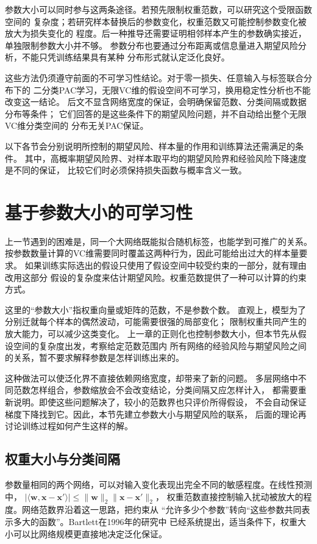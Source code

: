 参数大小可以同时参与这两条途径。若预先限制权重范数，可以研究这个受限函数空间的
复杂度；若研究样本替换后的参数变化，权重范数又可能控制参数变化被放大为损失变化的
程度。后一种推导还需要证明相邻样本产生的参数确实接近，单独限制参数大小并不够。
参数分布也要通过分布距离或信息量进入期望风险分析，不能只凭训练结果具有某种
分布形式就认定泛化良好。

这些方法仍须遵守前面的不可学习性结论。对于零一损失、任意输入与标签联合分布下的
二分类PAC学习，无限VC维的假设空间不可学习，换用稳定性分析也不能改变这一结论。
后文不显含网络宽度的保证，会明确保留范数、分类间隔或数据分布等条件；
它们回答的是这些条件下的期望风险问题，并不自动给出整个无限VC维分类空间的
分布无关PAC保证。

以下各节会分别说明所控制的期望风险、样本量的作用和训练算法还需满足的条件。
其中，高概率期望风险界、对样本取平均的期望风险界和经验风险下降速度是不同的保证，
比较它们时必须保持损失函数与概率含义一致。

\section{基于参数大小的可学习性}
\label{sec:network-norm-bounds}

上一节遇到的困难是，同一个大网络既能拟合随机标签，也能学到可推广的关系。
按参数数量计算的VC维需要同时覆盖这两种行为，因此可能给出过大的样本量要求。
如果训练实际选出的假设只使用了假设空间中较受约束的一部分，就有理由改用这部分
假设的复杂度来估计期望风险。权重范数提供了一种可以计算的约束方式。

这里的“参数大小”指权重向量或矩阵的范数，不是参数个数。
直观上，模型为了分别迁就每个样本的偶然波动，可能需要很强的局部变化；
限制权重共同产生的放大能力，可以减少这类变化。
上一章的正则化也控制参数大小，但本节先从假设空间的复杂度出发，考察给定范数范围内
所有网络的经验风险与期望风险之间的关系，暂不要求解释参数是怎样训练出来的。

这种做法可以使泛化界不直接依赖网络宽度，却带来了新的问题。
多层网络中不同范数怎样组合，参数缩放会不会改变结论，分类间隔又应怎样计入，
都需要重新说明。即使这些问题解决了，较小的范数界也只评价所得假设，
不会自动保证梯度下降找到它。因此，本节先建立参数大小与期望风险的联系，
后面的理论再讨论训练过程如何产生这样的解。

\subsection{权重大小与分类间隔}

参数量相同的两个网络，可以对输入变化表现出完全不同的敏感程度。在线性预测中，
$|\langle\bm w,\bm x-\bm x'\rangle|\leq\|\bm w\|_2\|\bm x-\bm x'\|_2$，
权重范数直接控制输入扰动被放大的程度。网络范数界沿着这一思路，把约束从
“允许多少个参数”转向“这些参数共同表示多大的函数”。Bartlett在1996年的研究中
已经系统提出，适当条件下，权重大小可以比网络规模更直接地决定泛化保证。

